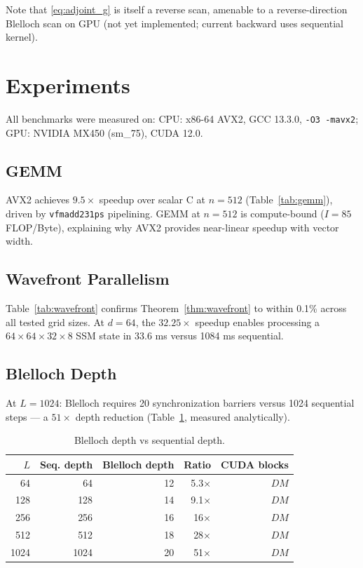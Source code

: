 \documentclass[10pt,onecolumn]{article}
\begin{document}
Note that \eqref{eq:adjoint_g} is itself a reverse scan, amenable to
a reverse-direction Blelloch scan on GPU (not yet implemented;
current backward uses sequential kernel).

\section{Experiments}
\label{sec:experiments}

All benchmarks were measured on:
CPU: x86-64 AVX2, GCC 13.3.0, \texttt{-O3 -mavx2};
GPU: NVIDIA MX450 (sm\_75), CUDA 12.0.

\subsection{GEMM}
AVX2 achieves $9.5\times$ speedup over scalar C at $n = 512$
(Table~\ref{tab:gemm}), driven by \texttt{vfmadd231ps} pipelining.
GEMM at $n = 512$ is compute-bound ($I = 85$ FLOP/Byte),
explaining why AVX2 provides near-linear speedup with vector width.

\subsection{Wavefront Parallelism}
Table~\ref{tab:wavefront} confirms Theorem~\ref{thm:wavefront}
to within 0.1\% across all tested grid sizes.
At $d = 64$, the $32.25\times$ speedup enables processing a
$64 \times 64 \times 32 \times 8$ SSM state in 33.6 ms versus
1084 ms sequential.

\subsection{Blelloch Depth}
At $L = 1024$: Blelloch requires 20 synchronization barriers versus
1024 sequential steps — a $51\times$ depth reduction
(Table~\ref{tab:blelloch}, measured analytically).

\begin{table}[htbp]
\centering
\caption{Blelloch depth vs sequential depth.}
\label{tab:blelloch}
\begin{tabular}{rrrrr}
\toprule
$L$ & Seq. depth & Blelloch depth & Ratio & CUDA blocks \\
\midrule
  64 & 64 & 12 & 5.3× & $DM$ \\
 128 & 128 & 14 & 9.1× & $DM$ \\
 256 & 256 & 16 & 16× & $DM$ \\
 512 & 512 & 18 & 28× & $DM$ \\
1024 & 1024 & 20 & 51× & $DM$ \\
\bottomrule
\end{tabular}
\end{table}
\end{document}
